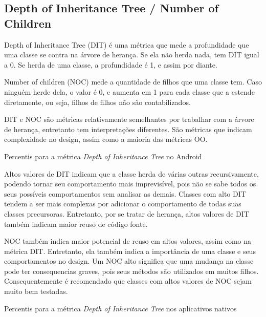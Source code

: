 \subsection{Depth of Inheritance Tree / Number of Children}

Depth of Inheritance Tree (DIT) é uma métrica que mede a profundidade que uma classe se contra na árvore de herança. Se ela não herda nada, tem DIT igual a 0. Se herda de uma classe, a profundidade é 1, e assim por diante. 

Number of children (NOC) mede a quantidade de filhos que uma classe tem. Caso ninguém herde dela, o valor é 0, e aumenta em 1 para cada classe que a estende diretamente, ou seja, filhos de filhos não são contabilizados.

DIT e NOC são métricas relativamente semelhantes por trabalhar com a árvore de herança, entretanto tem interpretações diferentes. São métricas que indicam complexidade no design, assim como a maioria das métricas OO.

\begin{table}[!htb]

\caption{Percentis para a métrica \textit{Depth of Inheritance Tree} no Android}
\label{tab:dit_android}
\end{table}

Altos valores de DIT indicam que a classe herda de várias outras recursivamente, podendo tornar seu comportamento mais imprevisível, pois não se sabe todos os seus possíveis comportamentos sem analisar as demais. Classes com alto DIT tendem a ser mais complexas por adicionar o comportamento de todas suas classes precursoras. Entretanto, por se tratar de herança, altos valores de DIT também indicam maior reuso de código fonte.

NOC também indica maior potencial de reuso em altos valores, assim como na métrica DIT. Entretanto, ela também indica a importância de uma classe e seus comportamentos no design. Um NOC alto significa que uma mudança na classe pode ter consequencias graves, pois seus métodos são utilizados em muitos filhos. Consequentemente é recomendado que classes com altos valores de NOC sejam muito bem testadas.

\begin{table}[!htb]

\caption{Percentis para a métrica \textit{Depth of Inheritance Tree} nos aplicativos nativos}
\label{tab:dit_apps}
\end{table}

